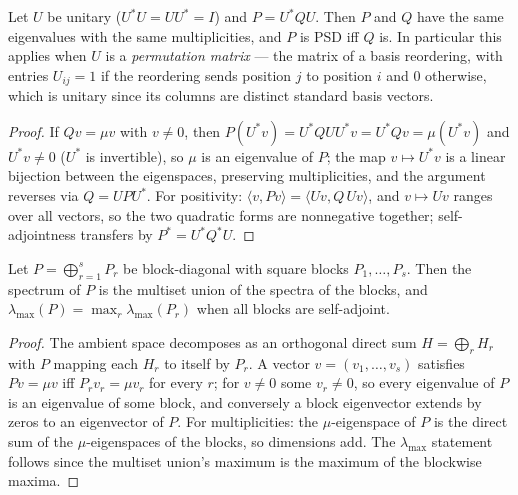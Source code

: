 \begin{lemma}\label{ch02:lem:perm-similarity}
Let $U$ be unitary ($U^{*} U = U U^{*} = I$) and $P = U^{*} Q U$. Then
$P$ and $Q$ have the same eigenvalues with the same multiplicities, and
$P$ is PSD iff $Q$ is. In particular this applies when $U$ is a
\emph{permutation matrix} --- the matrix of a basis reordering, with
entries $U_{ij} = 1$ if the reordering sends position $j$ to position
$i$ and $0$ otherwise, which is unitary since its columns are distinct
standard basis vectors.
\end{lemma}

\begin{proof}
If $Q v = \mu v$ with $v \neq 0$, then
$P (U^{*} v) = U^{*} Q U U^{*} v = U^{*} Q v = \mu (U^{*} v)$ and
$U^{*} v \neq 0$ ($U^{*}$ is invertible), so $\mu$ is an eigenvalue of
$P$; the map $v \mapsto U^{*} v$ is a linear bijection between the
eigenspaces, preserving multiplicities, and the argument reverses via
$Q = U P U^{*}$. For positivity:
$\langle v, P v \rangle = \langle U v, Q\, U v \rangle$, and
$v \mapsto U v$ ranges over all vectors, so the two quadratic forms
are nonnegative together; self-adjointness transfers by
$P^{*} = U^{*} Q^{*} U$.
\end{proof}

\begin{lemma}\label{ch02:lem:direct-sum}
Let $P = \bigoplus_{r=1}^{s} P_r$ be block-diagonal with square blocks
$P_1, \dots, P_s$. Then the spectrum of $P$ is the multiset union of
the spectra of the blocks, and $\lambda_{\max}(P) = \max_r
\lambda_{\max}(P_r)$ when all blocks are self-adjoint.
\end{lemma}

\begin{proof}
The ambient space decomposes as an orthogonal direct sum
$H = \bigoplus_r H_r$ with $P$ mapping each $H_r$ to itself by $P_r$.
A vector $v = (v_1, \dots, v_s)$ satisfies $P v = \mu v$ iff
$P_r v_r = \mu v_r$ for every $r$; for $v \ne 0$ some $v_r \neq 0$, so
every eigenvalue of $P$ is an eigenvalue of some block, and conversely a
block eigenvector extends by zeros to an eigenvector of $P$. For
multiplicities: the $\mu$-eigenspace of $P$ is the direct sum of the
$\mu$-eigenspaces of the blocks, so dimensions add. The
$\lambda_{\max}$ statement follows since the multiset union's maximum is
the maximum of the blockwise maxima.
\end{proof}

